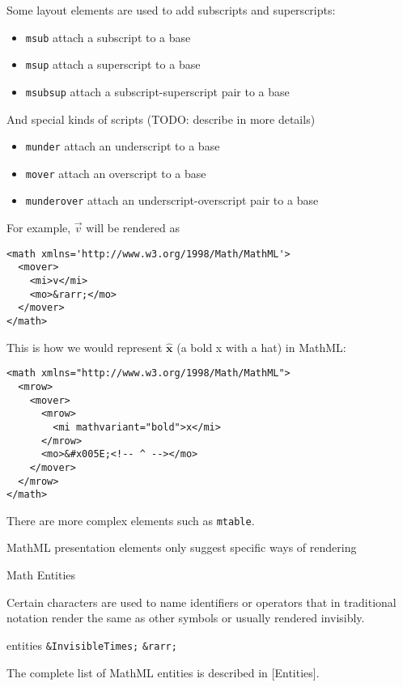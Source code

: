 Some layout elements are used to add subscripts and superscripts:

\begin{itemize}
\itemsep1pt\parskip0pt
\item
  \texttt{msub} attach a subscript to a base
\item
  \texttt{msup} attach a superscript to a base
\item
  \texttt{msubsup} attach a subscript-superscript pair to a base
\end{itemize}

And special kinds of scripts (TODO: describe in more details)

\begin{itemize}
\itemsep1pt\parskip0pt
\item
  \texttt{munder} attach an underscript to a base
\item
  \texttt{mover} attach an overscript to a base
\item
  \texttt{munderover} attach an underscript-overscript pair to a base
\end{itemize}

For example, $\vec v$ will be rendered as

\begin{verbatim}
<math xmlns='http://www.w3.org/1998/Math/MathML'>
  <mover>
    <mi>v</mi>
    <mo>&rarr;</mo>
  </mover>
</math>
\end{verbatim}


This is how we would represent $\hat{ \mathbf x}$ (a bold x with a hat) in MathML:

\begin{verbatim}
<math xmlns="http://www.w3.org/1998/Math/MathML">
  <mrow>
    <mover>
      <mrow>
        <mi mathvariant="bold">x</mi>
      </mrow>
      <mo>&#x005E;<!-- ^ --></mo>
    </mover>
  </mrow>
</math>
\end{verbatim}

There are more complex elements such as \texttt{mtable}.

MathML presentation elements only suggest specific ways of rendering

Math Entities

Certain characters are used to name identifiers or operators that in
traditional notation render the same as other symbols or usually
rendered invisibly.

entities \texttt{\&InvisibleTimes;} \texttt{\&rarr;}

The complete list of MathML entities is described in [Entities].






